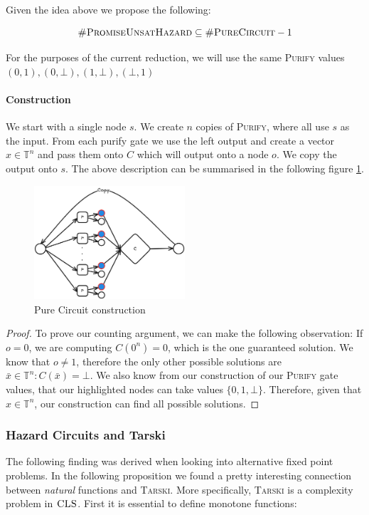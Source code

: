Given the idea above we propose the following:

\begin{proposition}
    $$
        \textnormal{\textsc{\#PromiseUnsatHazard}} \subseteq  \textnormal{\textsc{\#PureCircuit}} -1
    $$
\end{proposition}

For the purposes of the current reduction, we will use the same \textsc{Purify} values
$(0,1), (0,\bot), (1,\bot), (\bot, 1)$

\paragraph{Construction}
We start with a single node $s$. We create $n$ copies of \textsc{Purify}, where all 
use $s$ as the input. From each purify gate we use the left output and
create a vector $\hat{x} \in \mathbb{T}^n$ and pass them
onto $C$ which will output onto a node $o$. We copy the output onto $s$.
The above description can be summarised in the following figure \ref{fig:unsat-proof}.

\begin{figure}[h!]
    \centering
        \includegraphics[width=0.5\textwidth]{assets/circuit-unsat.png}
    \caption{Pure Circuit construction}
    \label{fig:unsat-proof}
\end{figure}

\begin{proof}
To prove our counting argument, we can make the following observation:
If $o = 0$, we are computing $C(0^n) = 0$, which is the one guaranteed solution.
We know that $o \neq 1$, therefore the only other possible solutions are $\bar{x} \in \mathbb{T}^n: C(\bar{x}) = \bot$.
We also know from our construction of our \textsc{Purify} gate values, that our highlighted nodes
    can take values $\{0,1,\bot\}$. Therefore, given that $\hat{x} \in \mathbb{T}^n$,
our construction can find all possible solutions.
\end{proof}


\subsubsection{Hazard Circuits and Tarski}
The following finding was derived when looking into alternative fixed point problems.
In the following proposition we found a pretty interesting connection between
\textit{natural} functions and \textsc{Tarski}. More specifically, 
\textsc{Tarski} is a complexity problem in $\textsc{CLS}$. First
it is essential to define monotone functions:

